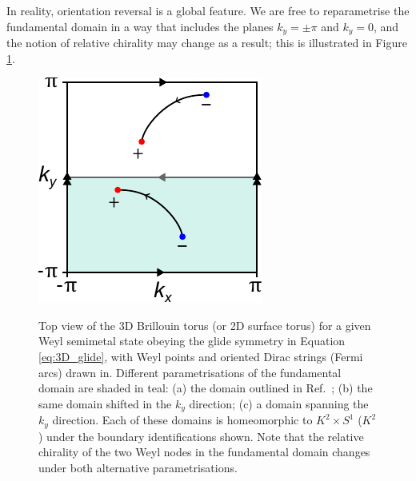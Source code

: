 In reality, orientation reversal is a global feature. We are free to reparametrise the fundamental domain in a way that includes the planes $k_y=\pm\pi$ and $k_y=0$, and the notion of relative chirality may change as a result; this is illustrated in Figure \ref{fig:BZ_param}.
\begin{figure}[htb!]
	\centering
	 {\includegraphics[width=.3\textwidth]{Images/BZ_basic}}
	\hfil
	\hfil
	\caption{Top view of the 3D Brillouin torus (or 2D surface torus) for a given Weyl semimetal state obeying the glide symmetry in Equation \eqref{eq:3D_glide}, with Weyl points and oriented Dirac strings (Fermi arcs) drawn in. Different parametrisations of the fundamental domain are shaded in teal: (a) the domain outlined in Ref.\ \cite{Fonseca-Vaidya_nonorientable}; (b) the same domain shifted in the $k_y$ direction; (c) a domain spanning the $k_y$ direction. Each of these domains is homeomorphic to $K^2\times S^1$ ($K^2$) under the boundary identifications shown. Note that the relative chirality of the two Weyl nodes in the fundamental domain changes under both alternative parametrisations.}
	\label{fig:BZ_param}
\end{figure}
